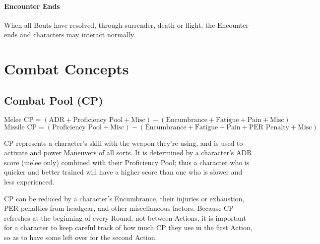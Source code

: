 \documentclass[oneside,11pt,english]{book}
\begin{document}
\paragraph{Encounter Ends}
When all Bouts have resolved, through surrender, death or flight, the Encounter ends and characters may
interact normally.


\section{Combat Concepts}
\subsection{Combat Pool (CP)}
\[\text{Melee CP} = (\text{ADR} + \text{Proficiency Pool} + \text{Misc}) - (\text{Encumbrance}+\text{Fatigue}+\text{Pain}+\text{Misc}) \]
\[\text{Missile CP} = (\text{Proficiency Pool} + \text{Misc})-(\text{Encumbrance} + \text{Fatigue} + \text{Pain} + \text{PER Penalty}+ \text{Misc}) \]

CP represents a character's skill with the weapon they’re using, and is used to activate and power
Maneuvers of all sorts. It is determined by a character's ADR score (melee only) combined with their Proficiency Pool; thus a character who is quicker and better trained will have a higher score than one who is slower and less experienced.

CP can be reduced by a character's Encumbrance, their injuries or exhaustion, PER penalties from %
headgear, and other miscellaneous factors. Because CP refreshes at the beginning of every Round, not
between Actions, it is important for a character to keep careful track of how much CP they use in the first Action, so as to have some left over for the second Action.
\end{document}
